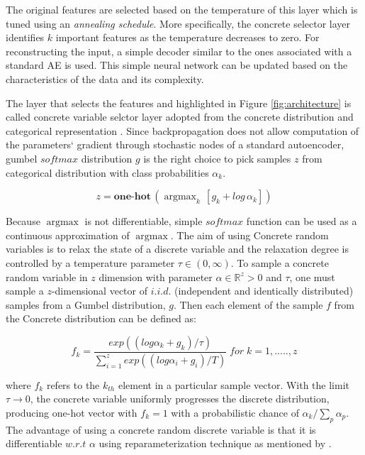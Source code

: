 \documentclass{bioinfo}
\newcommand{\R}{\mathbb{R}}
\DeclareMathOperator*{\argmax}{argmax}
\begin{document}
The original features are selected based on the temperature of this layer which is tuned using an \emph{annealing schedule}. More specifically, the concrete selector layer identifies $k$ important features as the temperature decreases to zero. 
For reconstructing the input, a simple decoder similar to the ones associated with a standard AE is used. 
This simple neural network can be updated based on the characteristics of the data and its complexity.

The layer that selects the features and highlighted in Figure \ref{fig:architecture} is called concrete variable selctor layer adopted from the concrete distribution \citep{maddison2016concrete} and categorical representation \citep{jang2016categorical}. 
Since backpropagation does not allow computation of the parameters` gradient through stochastic nodes of a standard autoencoder, gumbel $softmax$ distribution $g$ \citep{gumbel1954statistical} is the right choice to pick samples $z$ from categorical distribution with class probabilities $\alpha_k$. 

\begin{equation}
	z = \textbf{one-hot} \, (\argmax_k \, [g_k + log \, \alpha_k])
\end{equation}

Because $\argmax$ is not differentiable, simple $softmax$ function can be used as a continuous approximation of $\argmax$. The aim of using Concrete random variables is to relax the state of a discrete variable and the relaxation degree is controlled by a temperature parameter $\tau \in (0, \infty)$. To sample a concrete random variable in $z$ dimension with parameter $\alpha \in \R ^z>0$ and $\tau$, one must sample a $z$-dimensional vector of $i.i.d.$ (independent and identically distributed) samples from a Gumbel distribution, $g.$ Then each element of the sample $f$ from the Concrete distribution can be defined as:

\begin{equation}
    f_k = \frac{exp((log \alpha_k + g_k)/\tau)}{\sum_{i=1} ^z exp((log \alpha_i + g_i)/T) } \; for \; k = 1,.....,z
\end{equation}

where $f_k$ refers to the $k_{th}$ element in a particular sample vector. 
With the limit $\tau \to 0$, the concrete variable uniformly progresses the discrete distribution, producing one-hot vector with $f_k = 1$ with a probabilistic chance of $\alpha _k/\sum_p \alpha _p$.
The advantage of using a concrete random discrete variable is that it is differentiable $w.r.t$ $\alpha$ using reparameterization technique as mentioned by \citep{kingma2013auto}.
\end{document}
